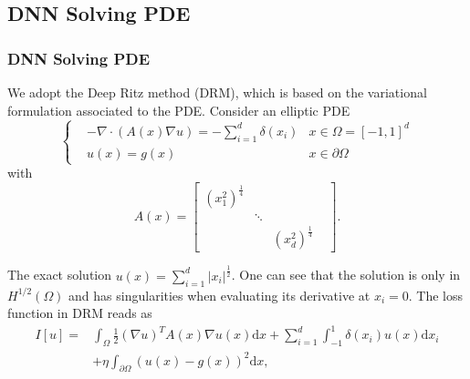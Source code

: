 \documentclass{beamer}
\begin{document}
\subsection{DNN Solving PDE}
\begin{frame}
\frametitle{DNN Solving PDE}
We adopt the Deep Ritz method (DRM), which is based on the variational formulation associated to the PDE. Consider an elliptic PDE
\begin{equation}\label{eqn:pde}
\left\{
\begin{aligned}
&-\nabla \cdot ( A(x) \nabla u) = - \sum_{i=1}^d\delta(x_i) & x\in \Omega=[-1,1]^d\\
&u(x) = g(x)  & x\in \partial \Omega
\end{aligned}\right.
\end{equation} 
with
\begin{equation}
	A(x)= 
	\left[\begin{matrix}
		(x_1^2)^{\frac{1}{4}} & & \\
		& \ddots & &\\
		& &  (x_d^2)^{\frac{1}{4}}
	\end{matrix}\right].
\end{equation}

\end{frame}
\begin{frame}
The exact solution $u(x)= \sum_{i=1}^d|x_i|^{\frac{1}{2}}$. One can see that the solution is only in $H^{1/2}(\Omega)$ and has singularities when evaluating its derivative at $x_i =0$. The loss function in DRM reads as 
\begin{equation}
\begin{aligned}
	I[u] =& \int_{\Omega}\frac{1}{2}(\nabla u)^T  A(x)  \nabla u(x)\mathrm{d}x + \sum_{i=1}^d\int_{-1}^{1}\delta(x_i)u(x)\mathrm{d}x_i \\ & + \eta \int_{\partial \Omega} (u(x)-g(x))^2 \mathrm{d}x,
	\end{aligned}
\end{equation}	
\end{frame}
\end{document}
